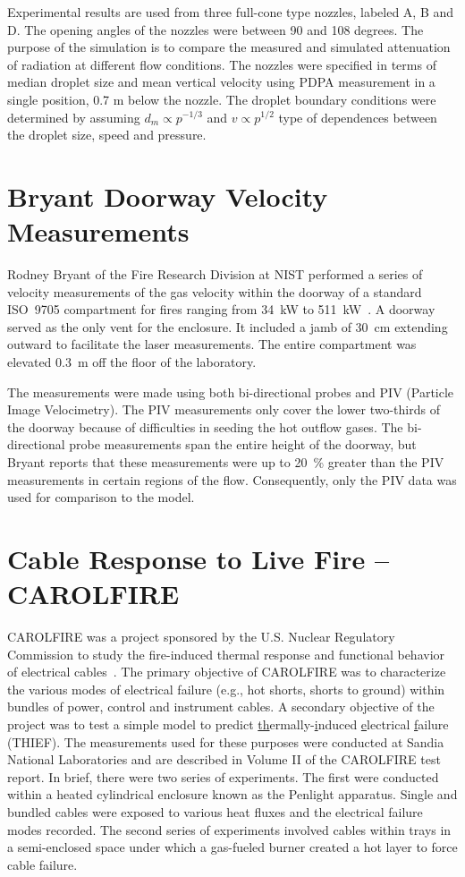 Experimental results are used from three full-cone type nozzles, labeled A, B and D. The opening angles of the nozzles were between 90 and 108 degrees.
The purpose of the simulation is to compare the measured and simulated attenuation of radiation at different flow conditions. The nozzles were
specified in terms of median droplet size and mean vertical velocity using PDPA measurement in a single position, 0.7 m below the nozzle. The droplet
boundary conditions were determined by assuming $d_m \propto p^{-1/3}$ and $v \propto p^{1/2}$ type of dependences between the droplet size, speed
and pressure.

\section{Bryant Doorway Velocity Measurements}

Rodney Bryant of the Fire Research Division at NIST performed a series of velocity measurements of the gas
velocity within the doorway of a standard ISO~9705 compartment for fires ranging from
34~kW to 511~kW~\cite{Bryant:FSJ2009,Bryant:EF2009,Bryant:CS2010}. A doorway
served as the only vent for the enclosure. It included a jamb of 30~cm extending outward
to facilitate the laser measurements. The entire compartment was elevated 0.3~m off the floor of the laboratory.

The measurements were made using both bi-directional probes and PIV (Particle Image Velocimetry). The PIV measurements only cover the
lower two-thirds of the doorway because of difficulties in seeding the hot outflow gases. The bi-directional probe measurements span the
entire height of the doorway, but Bryant reports that
these measurements were up to 20~\% greater than the PIV measurements in certain regions of
the flow. Consequently, only the PIV data was used for comparison to the
model.


\section{Cable Response to Live Fire -- CAROLFIRE}

CAROLFIRE was a project sponsored by the U.S. Nuclear Regulatory Commission to study the fire-induced thermal
response and functional behavior of electrical cables~\cite{CAROLFIRE}.
The primary objective of CAROLFIRE was to characterize the various modes of electrical
failure (e.g., hot shorts, shorts to ground) within bundles of power, control and instrument cables.
A secondary objective of the project was to test a simple model to predict \underline{th}ermally-\underline{i}nduced
\underline{e}lectrical \underline{f}ailure (THIEF). The measurements used for these purposes were conducted at Sandia National Laboratories and are described in
Volume II of the CAROLFIRE test report. In brief, there were two series of experiments. The first were conducted within
a heated cylindrical enclosure known as the Penlight apparatus. Single and bundled cables were exposed to various heat fluxes and the
electrical failure modes recorded. The second series of experiments involved cables within trays in a semi-enclosed space under which a gas-fueled burner
created a hot layer to force cable failure.

